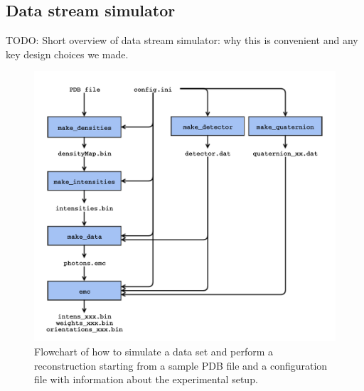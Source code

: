 \documentclass[]{iucr}              %
\begin{document}
\subsection{Data stream simulator}\label{sec:dataStreamSim}

TODO: Short overview of data stream simulator: why this is convenient and any key design choices we made.

\begin{figure}
\caption{Flowchart of how to simulate a data set and perform a reconstruction starting from a sample PDB file and a configuration file with information about the experimental setup.}
\includegraphics[width=\textwidth]{figures/emc_sim.pdf}
\end{figure}
\end{document}
